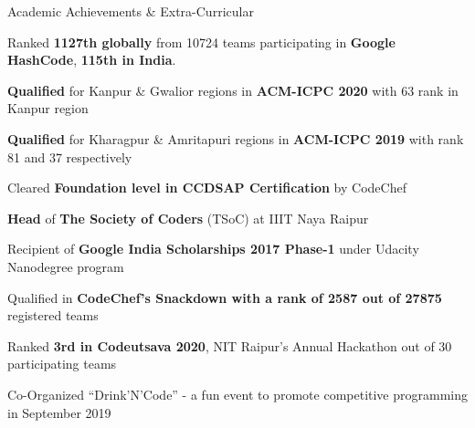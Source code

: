 \documentclass{resume} %
\begin{document}





\begin{rSection}{Academic Achievements \& Extra-Curricular} 

\begin{rSubsection}{}{}{}{}
\item Ranked {\bf 1127th globally} from 10724 teams participating in {\bf Google HashCode}, {\bf 115th in India}.

\item {\bf Qualified} for Kanpur \& Gwalior regions in {\bf ACM-ICPC 2020} with  63 rank in Kanpur region


\item {\bf Qualified} for Kharagpur \& Amritapuri regions in {\bf ACM-ICPC 2019} with rank 81 and 37 respectively 

\item Cleared {\bf Foundation level in CCDSAP Certification} by CodeChef 

\item {\bf Head} of {\bf The Society of Coders} (TSoC) at IIIT Naya Raipur


\item Recipient of {\bf Google India Scholarships 2017 Phase-1} under Udacity Nanodegree program

\item Qualified in {\bf CodeChef's Snackdown with a rank of 2587 out of 27875} registered teams 
\item Ranked {\bf 3rd in Codeutsava 2020}, NIT Raipur’s Annual Hackathon out of 30 participating teams

\item Co-Organized “Drink'N'Code” - a fun event to promote competitive programming in September 2019



\end{rSubsection}

\end{rSection}

\end{document}
